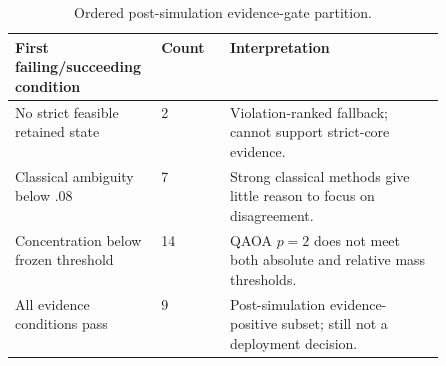 \begin{table}[h]
\centering
\caption{Ordered post-simulation evidence-gate partition.}
\label{tab:gatepartition}
\small
\begin{tabularx}{\linewidth}{@{}p{0.34\linewidth}p{0.16\linewidth}X@{}}
\toprule
First failing/succeeding condition & Count & Interpretation \\
\midrule
No strict feasible retained state & 2 & Violation-ranked fallback; cannot support strict-core evidence. \\
Classical ambiguity below .08 & 7 & Strong classical methods give little reason to focus on disagreement. \\
Concentration below frozen threshold & 14 & QAOA $p=2$ does not meet both absolute and relative mass thresholds. \\
All evidence conditions pass & 9 & Post-simulation evidence-positive subset; still not a deployment decision. \\
\bottomrule
\end{tabularx}
\end{table}
